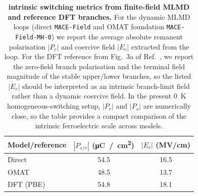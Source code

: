\documentclass[aps,physrev,graphicx,amsmath,amssymb,
               reprint,superscriptaddress]{revtex4-2}
\begin{document}
\begin{table}[t]
\centering
\small
\setlength{\tabcolsep}{6pt}
\begin{tabular}{lcc}
\hline\hline
Model/reference & $|P_{s/r}|$ (\si{\micro C / cm^2}) & $|E_c|$ (\si{MV/cm}) \\
\hline
Direct & 54.5 & 16.5 \\
OMAT & 48.5 & 13.7 \\
DFT (PBE)~\cite{allegro-pol-2025} & 54.8 & 18.1 \\
\hline\hline
\end{tabular}
\caption{\textbf{ intrinsic switching metrics from finite-field MLMD and reference DFT branches.} For the dynamic MLMD loops (direct \texttt{MACE-Field} and OMAT foundation \texttt{MACE-Field-MH-0}) we report the average absolute remanent polarisation $|P_r|$ and coercive field $|E_c|$ extracted from the loop. For the DFT reference from Fig.~3a of Ref.~\cite{allegro-pol-2025}, we report the zero-field branch polarisation and the terminal field magnitude of the stable upper/lower branches, so the listed $|E_c|$ should be interpreted as an intrinsic branch-limit field rather than a dynamic coercive field. In the present 0~K homogeneous-switching setup, $|P_r|$ and $|P_s|$ are numerically close, so the table provides a compact comparison of the intrinsic ferroelectric scale across models.}
\label{tab:bto_hysteresis_compare}
\end{table}
\end{document}

